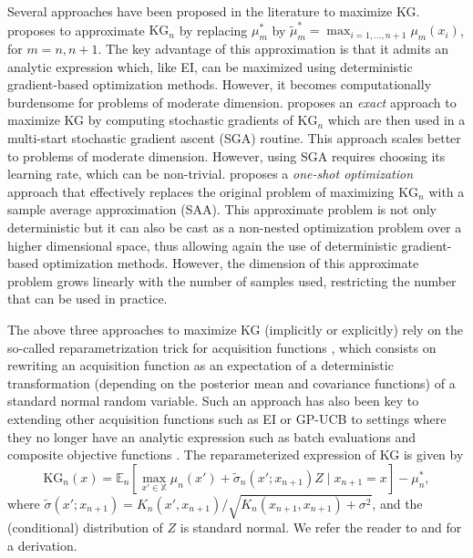 \documentclass{wscpaperproc}
\newcommand{\E}{\mathbb{E}}
\newcommand{\X}{\mathbb{X}}
\newcommand{\KG}{\mathrm{KG}}
\theoremstyle{wsc}
\begin{document}
Several approaches have been  proposed in the literature to  maximize KG.  proposes to approximate $\KG_n$ by replacing $\mu_m^*$  by $\widetilde{\mu}_m^* = \max_{i=1,\ldots,n+1}\mu_m(x_i)$, for $m=n, n+1$. The key advantage of this approximation is that it admits an analytic expression which, like EI, can be maximized using deterministic gradient-based optimization methods. However, it becomes computationally burdensome for problems of moderate dimension.  proposes an \textit{exact} approach to maximize KG by computing stochastic gradients of $\KG_n$ which are then used in  a multi-start stochastic gradient ascent (SGA) routine. This approach scales better to problems of moderate dimension. However, using SGA requires choosing its learning rate, which can be non-trivial.   proposes a \textit{one-shot optimization}  approach that effectively replaces the original problem of maximizing $\KG_n$ with a sample average approximation (SAA). This approximate problem is not only deterministic but it can also be cast as a non-nested optimization problem over a higher dimensional space, thus allowing again the use of deterministic gradient-based optimization methods. However, the dimension of this approximate problem grows linearly with the number of samples used, restricting the number that can be used in practice.

The above three approaches to maximize KG (implicitly or explicitly) rely on the so-called reparametrization trick for acquisition functions , which consists on rewriting an acquisition function as an expectation of a deterministic transformation (depending on the posterior mean and covariance functions) of a standard normal random variable. Such an approach has also been key to extending other acquisition functions such as EI or GP-UCB to settings where they no longer have an analytic expression such as batch evaluations  and composite objective functions . The reparameterized expression of KG is given by
\begin{equation*}
    \KG_n(x) = \E_n\left[ \max_{x'\in\X}\mu_n(x') + \widetilde{\sigma}_n(x'; x_{n+1})Z \mid x_{n+1}=x\right] - \mu_n^*,
\end{equation*}
where $\widetilde{\sigma}(x'; x_{n+1}) = K_n(x',x_{n+1})/\sqrt{K_n(x_{n+1}, x_{n+1}) + \sigma^2}$, and the (conditional) distribution of $Z$ is standard normal. We refer the reader to  and  for a derivation.
\end{document}
